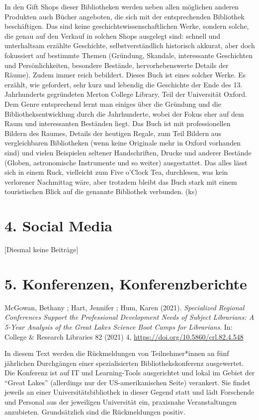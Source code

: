 \documentclass[a4paper,
fontsize=11pt,
oneside,
numbers=noperiodatend,
parskip=half-,
bibliography=totoc,
final
]{scrartcl}
\begin{document}
In den Gift Shops dieser Bibliotheken werden neben allen möglichen
anderen Produkten auch Bücher angeboten, die sich mit der entsprechenden
Bibliothek beschäftigen. Das sind keine geschichtswissenschaftlichen
Werke, sondern solche, die genau auf den Verkauf in solchen Shops
ausgelegt sind: schnell und unterhaltsam erzählte Geschichte,
selbstverständlich historisch akkurat, aber doch fokussiert auf
bestimmte Themen (Gründung, Skandale, interessante Geschichten und
Persönlichkeiten, besondere Bestände, hervorhebenswerte Details der
Räume). Zudem immer reich bebildert. Dieses Buch ist eines solcher
Werke. Es erzählt, wie gefordert, sehr kurz und lebendig die Geschichte
der Ende des 13. Jahrhunderts gegründeten Merton College Library, Teil
der Universität Oxford. Dem Genre entsprechend lernt man einiges über
die Gründung und die Bibliotheksentwicklung durch die Jahrhunderte,
wobei der Fokus eher auf dem Raum und interessanten Beständen liegt. Das
Buch ist mit professionellen Bildern des Raumes, Details der heutigen
Regale, zum Teil Bildern aus vergleichbaren Bibliotheken (wenn keine
Originale mehr in Oxford vorhanden sind) und vielen Beispielen seltener
Handschriften, Drucke und anderer Bestände (Globen, astronomische
Instrumente und so weiter) ausgestattet. Das alles lässt sich in einem
Ruck, vielleicht zum Five o'Clock Tea, durchlesen, was kein verlorener
Nachmittag wäre, aber trotzdem bleibt das Buch stark mit einem
touristischen Blick auf die genannte Bibliothek verbunden. (ks)

\hypertarget{social-media}{%
\section{4. Social Media}\label{social-media}}

{[}Diesmal keine Beiträge{]}

\hypertarget{konferenzen-konferenzberichte}{%
\section{5. Konferenzen,
Konferenzberichte}\label{konferenzen-konferenzberichte}}

McGowan, Bethany ; Hart, Jennifer ; Hum, Karen (2021). \emph{Specialized
Regional Conferences Support the Professional Development Needs of
Subject Librarians: A 5-Year Analysis of the Great Lakes Science Boot
Camps for Librarians}. In: College \& Research Libraries 82 (2021) 4,
\url{https://doi.org/10.5860/crl.82.4.548}

In diesem Text werden die Rückmeldungen von Teilnehmer*innen an fünf
jährlichen Durchgängen einer spezialisierten Bibliothekskonferenz
ausgewertet. Die Konferenz ist auf IT und Learning-Tools ausgerichtet
und lokal im Gebiet der \enquote{Great Lakes} (allerdings nur der
US-amerikanischen Seite) verankert. Sie findet jeweils an einer
Universitätsbibliothek in dieser Gegend statt und lädt Forschende und
Personal aus der jeweiligen Universität ein, praxisnahe Veranstaltungen
anzubieten. Grundsätzlich sind die Rückmeldungen positiv.
\end{document}
